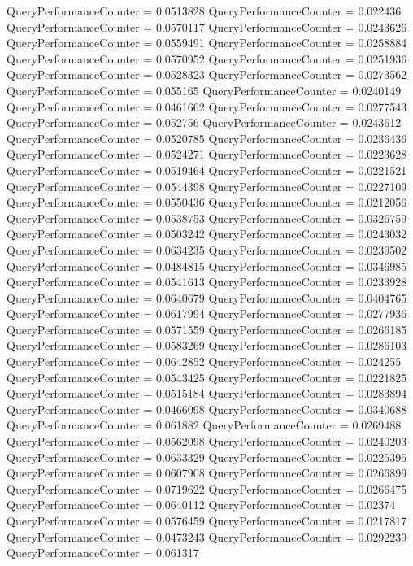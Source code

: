 \documentclass[9pt]{article}
\theoremstyle{plain}
\theoremstyle{definition}
\theoremstyle{remark}
\numberwithin{equation}{section}
\begin{document}
QueryPerformanceCounter  =  0.0513828
QueryPerformanceCounter  =  0.022436
QueryPerformanceCounter  =  0.0570117
QueryPerformanceCounter  =  0.0243626
QueryPerformanceCounter  =  0.0559491
QueryPerformanceCounter  =  0.0258884
QueryPerformanceCounter  =  0.0570952
QueryPerformanceCounter  =  0.0251936
QueryPerformanceCounter  =  0.0528323
QueryPerformanceCounter  =  0.0273562
QueryPerformanceCounter  =  0.055165
QueryPerformanceCounter  =  0.0240149
QueryPerformanceCounter  =  0.0461662
QueryPerformanceCounter  =  0.0277543
QueryPerformanceCounter  =  0.052756
QueryPerformanceCounter  =  0.0243612
QueryPerformanceCounter  =  0.0520785
QueryPerformanceCounter  =  0.0236436
QueryPerformanceCounter  =  0.0524271
QueryPerformanceCounter  =  0.0223628
QueryPerformanceCounter  =  0.0519464
QueryPerformanceCounter  =  0.0221521
QueryPerformanceCounter  =  0.0544398
QueryPerformanceCounter  =  0.0227109
QueryPerformanceCounter  =  0.0550436
QueryPerformanceCounter  =  0.0212056
QueryPerformanceCounter  =  0.0538753
QueryPerformanceCounter  =  0.0326759
QueryPerformanceCounter  =  0.0503242
QueryPerformanceCounter  =  0.0243032
QueryPerformanceCounter  =  0.0634235
QueryPerformanceCounter  =  0.0239502
QueryPerformanceCounter  =  0.0484815
QueryPerformanceCounter  =  0.0346985
QueryPerformanceCounter  =  0.0541613
QueryPerformanceCounter  =  0.0233928
QueryPerformanceCounter  =  0.0640679
QueryPerformanceCounter  =  0.0404765
QueryPerformanceCounter  =  0.0617994
QueryPerformanceCounter  =  0.0277936
QueryPerformanceCounter  =  0.0571559
QueryPerformanceCounter  =  0.0266185
QueryPerformanceCounter  =  0.0583269
QueryPerformanceCounter  =  0.0286103
QueryPerformanceCounter  =  0.0642852
QueryPerformanceCounter  =  0.024255
QueryPerformanceCounter  =  0.0543425
QueryPerformanceCounter  =  0.0221825
QueryPerformanceCounter  =  0.0515184
QueryPerformanceCounter  =  0.0283894
QueryPerformanceCounter  =  0.0466098
QueryPerformanceCounter  =  0.0340688
QueryPerformanceCounter  =  0.061882
QueryPerformanceCounter  =  0.0269488
QueryPerformanceCounter  =  0.0562098
QueryPerformanceCounter  =  0.0240203
QueryPerformanceCounter  =  0.0633329
QueryPerformanceCounter  =  0.0225395
QueryPerformanceCounter  =  0.0607908
QueryPerformanceCounter  =  0.0266899
QueryPerformanceCounter  =  0.0719622
QueryPerformanceCounter  =  0.0266475
QueryPerformanceCounter  =  0.0640112
QueryPerformanceCounter  =  0.02374
QueryPerformanceCounter  =  0.0576459
QueryPerformanceCounter  =  0.0217817
QueryPerformanceCounter  =  0.0473243
QueryPerformanceCounter  =  0.0292239
QueryPerformanceCounter  =  0.061317
\end{document}

